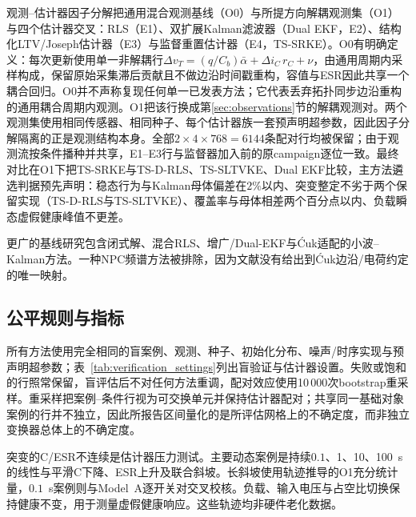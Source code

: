 \documentclass[zihao=5,a4paper]{ctexart}
\DeclareRobustCommand{\Cuk}{\mbox{\'{C}uk}}
\newcommand{\TSRLS}{TS-D-RLS}
\newcommand{\TSKF}{TS-SLTVKE}
\newcommand{\TSSRKE}{TS-SRKE}
\newcommand{\alphab}{\bar{\alpha}}
\begin{document}
观测--估计器因子分解把通用混合观测基线（O0）与所提方向解耦观测集（O1）与四个估计器交叉：RLS（E1）、双扩展Kalman滤波器（Dual EKF，E2）、结构化LTV/Joseph估计器（E3）与监督重置估计器（E4，\TSSRKE{}）。O0有明确定义：每次更新使用单一非解耦行$\Delta v_T=(q/C_b)\alphab+\Delta i_C\,r_C+\nu$，由通用周期内采样构成，保留原始采集滞后贡献且不做边沿时间戳重构，容值与ESR因此共享一个耦合回归。O0并不声称复现任何单一已发表方法；它代表丢弃拓扑同步边沿重构的通用耦合周期内观测。O1把该行换成第\ref{sec:observations}节的解耦观测对。两个观测集使用相同传感器、相同种子、每个估计器族一套预声明超参数，因此因子分解隔离的正是观测结构本身。全部$2\times4\times768=6144$条配对行均被保留；由于观测流按条件播种并共享，E1--E3行与监督器加入前的原campaign逐位一致。最终对比在O1下把\TSSRKE{}与\TSRLS{}、\TSKF{}、Dual EKF比较，主方法遴选判据预先声明：稳态行为与Kalman母体偏差在$2\%$以内、突变整定不劣于两个保留实现（\TSRLS{}与\TSKF{}）、覆盖率与母体相差两个百分点以内、负载瞬态虚假健康峰值不更差。

更广的基线研究包含闭式解、混合RLS、增广/Dual-EKF与\Cuk{}适配的小波--Kalman方法。一种NPC频谱方法被排除，因为文献没有给出到\Cuk{}边沿/电荷约定的唯一映射。

\subsection{公平规则与指标}

所有方法使用完全相同的盲案例、观测、种子、初始化分布、噪声/时序实现与预声明超参数；表~\ref{tab:verification_settings}列出盲验证与估计器设置。失败或饱和的行照常保留，盲评估后不对任何方法重调，配对效应使用10\,000次bootstrap重采样。重采样把案例--条件行视为可交换单元并保持估计器配对；共享同一基础对象案例的行并不独立，因此所报告区间量化的是所评估网格上的不确定度，而非独立变换器总体上的不确定度。

突变的C/ESR不连续是估计器压力测试。主要动态案例是持续$0.1$、1、10、100~s的线性与平滑C下降、ESR上升及联合斜坡。长斜坡使用轨迹推导的O1充分统计量，$0.1$~s案例则与Model~A逐开关对交叉校核。负载、输入电压与占空比切换保持健康不变，用于测量虚假健康响应。这些轨迹均非硬件老化数据。
\end{document}
